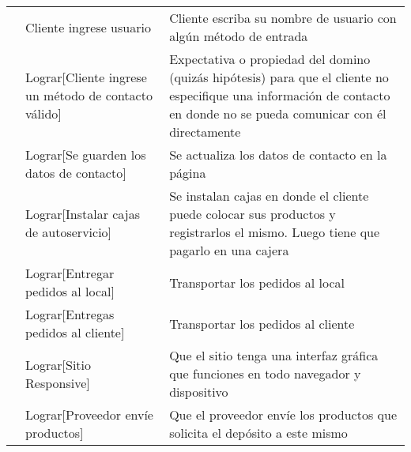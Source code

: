 \documentclass[a4paper]{article}
\begin{document}
\begin{table}[h]
\begin{tabular}{p{2cm} p{7cm} p{8cm}}
\rule{0pt}{1.2em} & Cliente ingrese usuario & Cliente escriba su nombre de usuario con algún método de entrada\\[0.2em]




\rule{0pt}{1.2em} & Lograr[Cliente ingrese un método de contacto válido] & Expectativa o propiedad del domino (quizás hipótesis) para que el cliente no especifique una información de contacto en donde no se pueda comunicar con él directamente\\[0.2em]

\rule{0pt}{1.2em} & Lograr[Se guarden los datos de contacto] & Se actualiza los datos de contacto en la página\\[0.2em]

\rule{0pt}{1.2em} & Lograr[Instalar cajas de autoservicio] & Se instalan cajas en donde el cliente puede colocar sus productos y registrarlos el mismo. Luego tiene que pagarlo en una cajera\\[0.2em]

\rule{0pt}{1.2em} & Lograr[Entregar pedidos al local] & Transportar los pedidos al local\\[0.2em]

\rule{0pt}{1.2em} & Lograr[Entregas pedidos al cliente] & Transportar los pedidos al cliente\\[0.2em]

\rule{0pt}{1.2em} & Lograr[Sitio Responsive] & Que el sitio tenga una interfaz gráfica que funciones en todo navegador y dispositivo\\[0.2em]

\rule{0pt}{1.2em} & Lograr[Proveedor envíe productos] & Que el proveedor envíe los productos que solicita el depósito a este mismo\\[0.2em]


\end{tabular}
\end{table}
\end{document}
